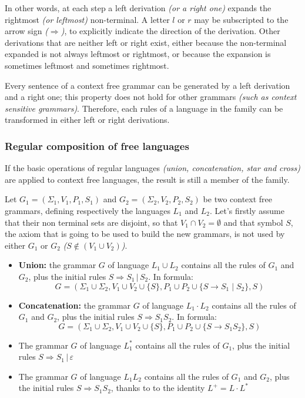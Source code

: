 \documentclass[english]{article}
\begin{document}
\bigskip
In other words, at each step a left derivation \textit{(or a right one)} expands the rightmost \textit{(or leftmost)} non-terminal.
A letter \(l\) or \(r\) may be subscripted to the arrow sign \textit{(\(\Rightarrow\))}, to explicitly indicate the direction of the derivation.
Other derivations that are neither left or right exist, either because the non-terminal expanded is not always leftmost or rightmost, or because the expansion is sometimes leftmost and sometimes rightmost.

Every sentence of a context free grammar can be generated by a left derivation and a right one;
this property does not hold for other grammars \textit{(such as context sensitive grammars)}.
Therefore, each rules of a language in the \CF family can be transformed in either left or right derivations.

\subsubsection{Regular composition of free languages}

If the basic operations of regular languages \textit{(union, concatenation, star and cross)} are applied to context free languages, the result is still a member of the \CF family.

Let \(G_1 = \left(\Sigma_1, V_1, P_1, S_1 \right)\) and \(G_2 = \left(\Sigma_2, V_2, P_2, S_2 \right)\) be two context free grammars, defining respectively the languages \(L_1\) and \(L_2\).
Let's firstly assume that their non terminal sets are disjoint, so that \(V_1 \cap V_2 = \emptyset\) and that symbol \(S\), the axiom that is going to be used to build the new grammars, is not used by either \(G_1\) or \(G_2\) \textit{(\(S \notin (V_1 \cup V_2)\))}.

\begin{itemize}
  \item \textbf{Union:} the grammar \(G\) of language \(L_1 \cup L_2\) contains all the rules of \(G_1\) and \(G_2\), plus the initial rules \(S \Rightarrow S_1 \,|\, S_2 \). In formula:
        \[ G = \left(\Sigma_1 \cup \Sigma_2, V_1 \cup V_2 \cup \{S\}, P_1 \cup P_2 \cup \{S \rightarrow S_1 \mid S_2\}, S \right) \]
  \item \textbf{Concatenation:} the grammar \(G\) of language \(L_1 \cdot L_2\) contains all the rules of \(G_1\) and \(G_2\), plus the initial rules \(S \Rightarrow S_1 S_2\). In formula:
        \[ G = \left(\Sigma_1 \cup \Sigma_2, V_1 \cup V_2 \cup \{S\}, P_1 \cup P_2 \cup \{S \rightarrow S_1 S_2\}, S \right) \]
  \item The grammar \(G\) of language \(L_1^\ast\) contains all the rules of \(G_1\), plus the initial rules \(S \Rightarrow S_1 \,|\, \varepsilon\)
  \item The grammar \(G\) of language \(L_1  L_2\) contains all the rules of \(G_1\) and \(G_2\), plus the initial rules \(S \Rightarrow S_1 S_2\), thanks to to the identity \(L^+ = L \cdot L^\ast\)
\end{itemize}
\end{document}
